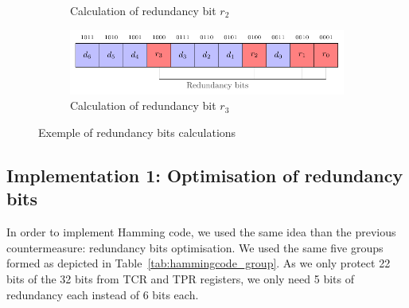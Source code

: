\begin{figure}[ht]
\begin{subfigure}[b]{0.49\textwidth}
        \caption{Calculation of redundancy bit $r_2$}
        \label{fig:hamming_code_example_4}
    \end{subfigure}
    \hfill
    \begin{subfigure}[b]{0.49\textwidth}
        \includegraphics[width=\textwidth, page=10]{c5_countermeasures_dift/img/hamming_bit.pdf}
        \caption{Calculation of redundancy bit $r_3$}
        \label{fig:hamming_code_example_5}
    \end{subfigure}
    \caption{Exemple of redundancy bits calculations}
    \label{fig:hamming_code_example}
\end{figure}

\subsection{Implementation 1: Optimisation of redundancy bits}

In order to implement Hamming code, we used the same idea than the previous countermeasure: redundancy bits optimisation. We used the same five groups formed as depicted in Table~\ref{tab:hammingcode_group}. As we only protect 22 bits of the 32 bits from TCR and TPR registers, we only need 5 bits of redundancy each instead of 6 bits each.

